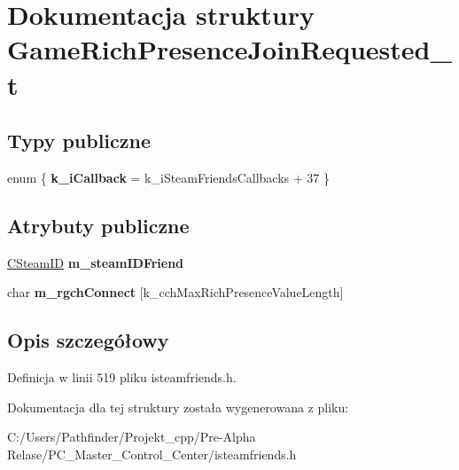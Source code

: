 \hypertarget{struct_game_rich_presence_join_requested__t}{}\section{Dokumentacja struktury Game\+Rich\+Presence\+Join\+Requested\+\_\+t}
\label{struct_game_rich_presence_join_requested__t}
\subsection*{Typy publiczne}
\begin{DoxyCompactItemize}
\item 
\mbox{\label{struct_game_rich_presence_join_requested__t_ae737c71c23b0f6d7ddd463ebab328c39}} 
enum \{ {\bfseries k\+\_\+i\+Callback} = k\+\_\+i\+Steam\+Friends\+Callbacks + 37
 \}
\end{DoxyCompactItemize}
\subsection*{Atrybuty publiczne}
\begin{DoxyCompactItemize}
\item 
\mbox{\label{struct_game_rich_presence_join_requested__t_a13d994983fb94969da7191d40761c2e8}} 
\hyperlink{class_c_steam_i_d}{C\+Steam\+ID} {\bfseries m\+\_\+steam\+I\+D\+Friend}
\item 
\mbox{\label{struct_game_rich_presence_join_requested__t_a6886af3808c473f4cd0982c7a2ab8428}} 
char {\bfseries m\+\_\+rgch\+Connect} \mbox{[}k\+\_\+cch\+Max\+Rich\+Presence\+Value\+Length\mbox{]}
\end{DoxyCompactItemize}


\subsection{Opis szczegółowy}


Definicja w linii 519 pliku isteamfriends.\+h.



Dokumentacja dla tej struktury została wygenerowana z pliku\+:\begin{DoxyCompactItemize}
\item 
C\+:/\+Users/\+Pathfinder/\+Projekt\+\_\+cpp/\+Pre-\/\+Alpha Relase/\+P\+C\+\_\+\+Master\+\_\+\+Control\+\_\+\+Center/isteamfriends.\+h\end{DoxyCompactItemize}
